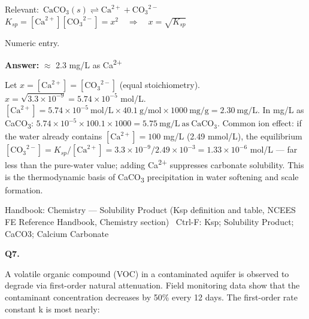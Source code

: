 \documentclass[11pt]{article}
\begin{document}
{\small\color{soft}Relevant:}\ $\mathrm{CaCO_3}(s) \rightleftharpoons \mathrm{Ca}^{2+} + \mathrm{CO_3}^{2-}$ \quad $K_{sp} = [\mathrm{Ca}^{2+}][\mathrm{CO_3}^{2-}] = x^{2}\quad \Rightarrow\quad x = \sqrt{K_{sp}}$\par\vspace{3pt}
{\small\color{soft}Numeric entry.}\par\vspace{3pt}
\vspace{2pt}\par\noindent\colorbox{boxbg}{\parbox{\dimexpr\linewidth-2\fboxsep\relax}{%
\vspace{2pt}\textbf{Answer:} $\approx$ 2.3 mg/L as Ca\textsuperscript{2}\textsuperscript{+}\par\vspace{2pt}
{\small Let $x = [\mathrm{Ca}^{2+}] = [\mathrm{CO_3}^{2-}]$ (equal stoichiometry). $x = \sqrt{3.3\times10^{-9}} = 5.74\times10^{-5}$ mol/L. $[\mathrm{Ca}^{2+}] = 5.74\times10^{-5}\ \mathrm{mol/L}\times40.1\ \mathrm{g/mol}\times1000\ \mathrm{mg/g} = 2.30\ \mathrm{mg/L}$. In mg/L as CaCO\textsubscript{3}: $5.74\times10^{-5}\times100.1\times1000 = 5.75\ \mathrm{mg/L\ as\ CaCO_3}$. Common ion effect: if the water already contains $[\mathrm{Ca}^{2+}] = 100$ mg/L (2.49 mmol/L), the equilibrium $[\mathrm{CO_3}^{2-}] = K_{sp}/[\mathrm{Ca}^{2+}] = 3.3\times10^{-9}/2.49\times10^{-3} = 1.33\times10^{-6}$ mol/L --- far less than the pure-water value; adding Ca\textsuperscript{2}\textsuperscript{+} suppresses carbonate solubility. This is the thermodynamic basis of CaCO\textsubscript{3} precipitation in water softening and scale formation.}\par\vspace{2pt}
{\footnotesize\color{soft}Handbook: Chemistry --- Solubility Product (Ksp definition and table, NCEES FE Reference Handbook, Chemistry section) \textbullet\ Ctrl-F: Ksp; Solubility Product; CaCO3; Calcium Carbonate}\vspace{2pt}
}}
\vspace{9pt}
\filbreak
\textbf{\color{accent}Q7.}\par\vspace{2pt}
A volatile organic compound (VOC) in a contaminated aquifer is observed to degrade via first-order natural attenuation. Field monitoring data show that the contaminant concentration decreases by 50\% every 12 days. The first-order rate constant k is most nearly:\par\vspace{3pt}
\end{document}
